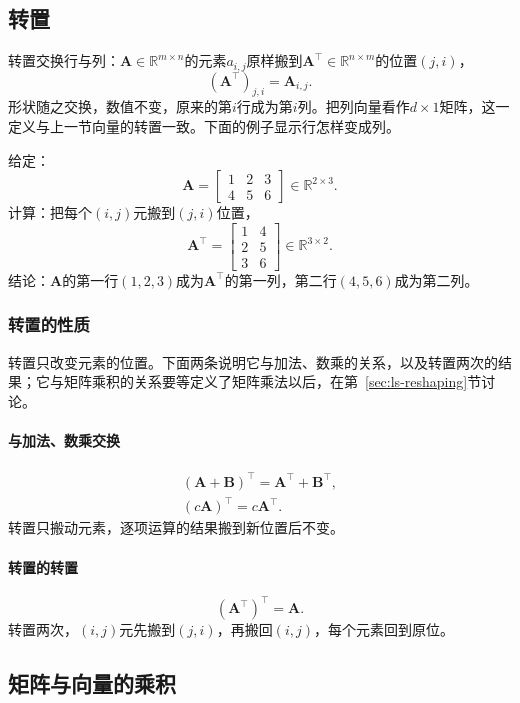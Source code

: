 \subsection{转置}
\label{sec:ls-matrix-transpose}

转置交换行与列：$\bm A\in\mathbb R^{m\times n}$的元素$a_{i,j}$原样搬到$\bm A^\top\in\mathbb R^{n\times m}$的位置$(j,i)$，
\[
 (\bm A^\top)_{j,i}=\bm A_{i,j}.
\]
形状随之交换，数值不变，原来的第$i$行成为第$i$列。把列向量看作$d\times1$矩阵，这一定义与上一节向量的转置一致。下面的例子显示行怎样变成列。
\begin{example}
\label{ex:ls-transpose-two-by-three}
给定：
\[
 \bm A=\begin{bmatrix}1&2&3\\4&5&6\end{bmatrix}\in\mathbb R^{2\times3}.
\]
计算：把每个$(i,j)$元搬到$(j,i)$位置，
\[
 \bm A^\top=\begin{bmatrix}1&4\\2&5\\3&6\end{bmatrix}\in\mathbb R^{3\times2}.
\]
结论：$\bm A$的第一行$(1,2,3)$成为$\bm A^\top$的第一列，第二行$(4,5,6)$成为第二列。
\end{example}

\subsubsection{转置的性质}

转置只改变元素的位置。下面两条说明它与加法、数乘的关系，以及转置两次的结果；它与矩阵乘积的关系要等定义了矩阵乘法以后，在第~\ref{sec:ls-reshaping}节讨论。

\paragraph{与加法、数乘交换}
\[
 \begin{gathered}
(\bm A+\bm B)^\top=\bm A^\top+\bm B^\top,\\
(c\bm A)^\top=c\bm A^\top.
 \end{gathered}
\]
转置只搬动元素，逐项运算的结果搬到新位置后不变。

\paragraph{转置的转置}
\[
 (\bm A^\top)^\top=\bm A.
\]
转置两次，$(i,j)$元先搬到$(j,i)$，再搬回$(i,j)$，每个元素回到原位。

\subsection{矩阵与向量的乘积}
\label{sec:prelim-matrix-records-prediction}

